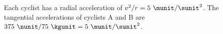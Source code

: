 Each cyclist has a radial acceleration of $v^2/r=5\ \munit/\sunit^2$.
The tangential accelerations of cyclists A and B are
$375\ \nunit/75\ \kgunit=5\ \munit/\sunit^2$.




